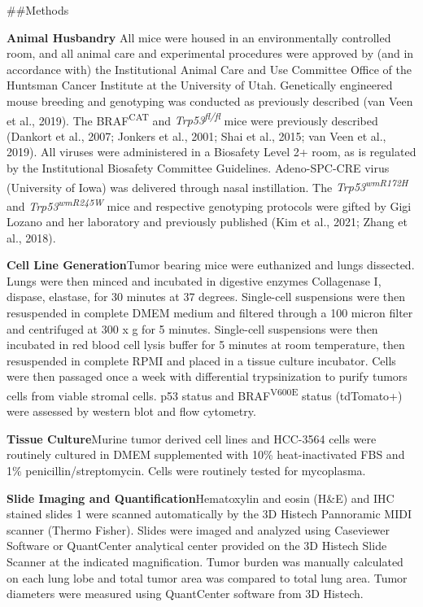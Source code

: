 \#\#Methods

\textbf{Animal Husbandry} All mice were housed in an environmentally controlled room, and all animal care and experimental procedures were approved by (and in accordance with) the Institutional Animal Care and Use Committee Office of the Huntsman Cancer Institute at the University of Utah. Genetically engineered mouse breeding and genotyping was conducted as previously described (van Veen et al., 2019). The BRAF\textsuperscript{CAT} and \emph{Trp53\textsuperscript{fl/fl}} mice were previously described (Dankort et al., 2007; Jonkers et al., 2001; Shai et al., 2015; van Veen et al., 2019). All viruses were administered in a Biosafety Level 2+ room, as is regulated by the Institutional Biosafety Committee Guidelines. Adeno-SPC-CRE virus (University of Iowa) was delivered through nasal instillation. The \emph{Trp53\textsuperscript{wmR172H}} and \emph{Trp53\textsuperscript{wmR245W}} mice and respective genotyping protocols were gifted by Gigi Lozano and her laboratory and previously published (Kim et al., 2021; Zhang et al., 2018).

\textbf{Cell Line Generation}Tumor bearing mice were euthanized and lungs dissected. Lungs were then minced and incubated in digestive enzymes Collagenase I, dispase, elastase, for 30 minutes at 37 degrees. Single-cell suspensions were then resuspended in complete DMEM medium and filtered through a 100 micron filter and centrifuged at 300 x g for 5 minutes. Single-cell suspensions were then incubated in red blood cell lysis buffer for 5 minutes at room temperature, then resuspended in complete RPMI and placed in a tissue culture incubator. Cells were then passaged once a week with differential trypsinization to purify tumors cells from viable stromal cells. p53 status and BRAF\textsuperscript{V600E} status (tdTomato+) were assessed by western blot and flow cytometry.

\textbf{Tissue Culture}Murine tumor derived cell lines and HCC-3564 cells were routinely cultured in DMEM supplemented with 10\% heat-inactivated FBS and 1\% penicillin/streptomycin. Cells were routinely tested for mycoplasma.

\textbf{Slide Imaging and Quantification}Hematoxylin and eosin (H\&E) and IHC stained slides 1 were scanned automatically by the 3D Histech Pannoramic MIDI scanner (Thermo Fisher). Slides were imaged and analyzed using Caseviewer Software or QuantCenter analytical center provided on the 3D Histech Slide Scanner at the indicated magnification. Tumor burden was manually calculated on each lung lobe and total tumor area was compared to total lung area. Tumor diameters were measured using QuantCenter software from 3D Histech.

